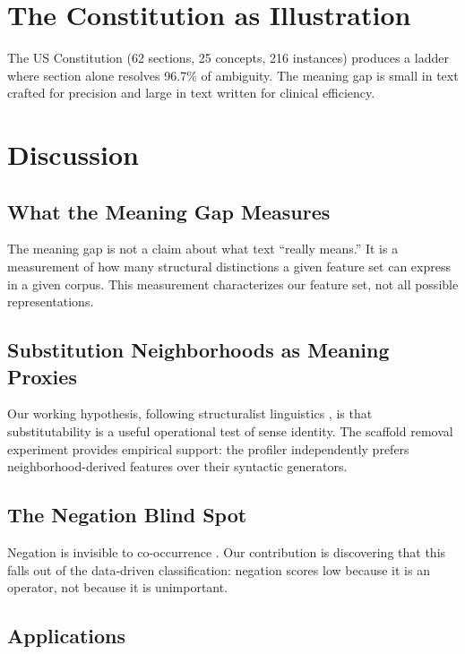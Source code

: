 \documentclass[11pt,a4paper]{article}
\begin{document}
\section{The Constitution as Illustration}

The US Constitution (62 sections, 25 concepts, 216 instances) produces a ladder where section alone resolves 96.7\% of ambiguity. The meaning gap is small in text crafted for precision and large in text written for clinical efficiency.

\section{Discussion}

\subsection{What the Meaning Gap Measures}

The meaning gap is not a claim about what text ``really means.'' It is a measurement of how many structural distinctions a given feature set can express in a given corpus. This measurement characterizes our feature set, not all possible representations.

\subsection{Substitution Neighborhoods as Meaning Proxies}

Our working hypothesis, following structuralist linguistics \citep{saussure1916,cruse1986}, is that substitutability is a useful operational test of sense identity. The scaffold removal experiment provides empirical support: the profiler independently prefers neighborhood-derived features over their syntactic generators.

\subsection{The Negation Blind Spot}

Negation is invisible to co-occurrence \citep{chapman2001}. Our contribution is discovering that this falls out of the data-driven classification: negation scores low because it is an operator, not because it is unimportant.

\subsection{Applications}
\end{document}
